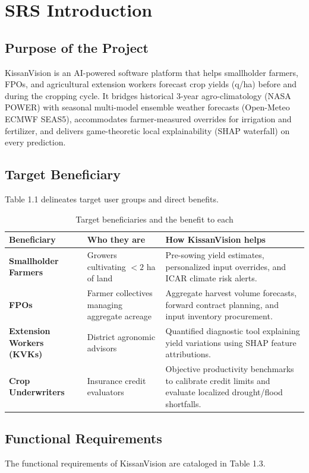\documentclass[11pt,a4paper]{report}
\begin{document}
\chapter{SRS Introduction}

\section{Purpose of the Project}
KissanVision is an AI-powered software platform that helps smallholder farmers, FPOs, and agricultural extension workers forecast crop yields (q/ha) before and during the cropping cycle. It bridges historical 3-year agro-climatology (NASA POWER) with seasonal multi-model ensemble weather forecasts (Open-Meteo ECMWF SEAS5), accommodates farmer-measured overrides for irrigation and fertilizer, and delivers game-theoretic local explainability (SHAP waterfall) on every prediction.

\section{Target Beneficiary}
Table 1.1 delineates target user groups and direct benefits.

\begin{table}[htbp]
\centering
\small
\caption{Target beneficiaries and the benefit to each}
\begin{tabularx}{\textwidth}{lXX}
\toprule
\textbf{Beneficiary} & \textbf{Who they are} & \textbf{How KissanVision helps} \\
\midrule
\textbf{Smallholder Farmers} & Growers cultivating $< 2$ ha of land & Pre-sowing yield estimates, personalized input overrides, and ICAR climate risk alerts. \\
\textbf{FPOs} & Farmer collectives managing aggregate acreage & Aggregate harvest volume forecasts, forward contract planning, and input inventory procurement. \\
\textbf{Extension Workers (KVKs)}& District agronomic advisors & Quantified diagnostic tool explaining yield variations using SHAP feature attributions. \\
\textbf{Crop Underwriters} & Insurance credit evaluators & Objective productivity benchmarks to calibrate credit limits and evaluate localized drought/flood shortfalls. \\
\bottomrule
\end{tabularx}
\end{table}

\section{Functional Requirements}
The functional requirements of KissanVision are cataloged in Table 1.3.
\end{document}
